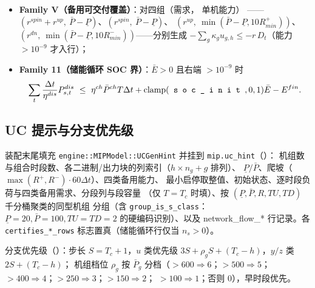 \begin{itemize}
\begin{equation}
        -\sum_g \bar P_g u_{g,h}-\sum_w P_{w,t}-\sum_s P_{s,t}
        -\sum_{s'}(P^{dis}_{s',t}-P^{ch}_{s',t})-\sum_d P^{dc}_{d,t}
        -P^{shed}_t+P^{curt}_t\le -(D_t+r^{up,tot}D_t),
        \label{eq:impl-famc}
        \end{equation}
        其中 $r^{up,tot}=r^{spin}+r^{up}$；下方向对偶地把系数反号、
        以 $\underline P_g$ 代 $\bar P_g$、右端取 $D_t-r^{dn}D_t$；
  \item \textbf{Family V（备用可交付覆盖）}：对四组（需求， 单机能力）
        ——$(r^{spin}+r^{up},\ \bar P-\underline P)$、$(r^{spin},\ \bar P-\underline P)$、
        $(r^{up},\ \min(\bar P-\underline P,10R^+_{min}))$、
        $(r^{dn},\ \min(\bar P-\underline P,10R^-_{min}))$——分别生成
        $-\sum_g \kappa_g u_{g,h}\le -r\,D_t$（能力 $>10^{-9}$ 才入行）；
  \item \textbf{Family 11（储能循环 SOC 界）}：$\bar E>0$ 且右端 $>10^{-9}$ 时
        \begin{equation}
        \sum_t \frac{\Delta t}{\eta^{dis}}P^{dis}_{s,t}\ \le\
        \eta^{ch}\bar P^{ch} T\Delta t+\mathrm{clamp}(\fld{soc\_init},0,1)\bar E-E^{fin}.
        \label{eq:impl-fam11}
        \end{equation}
\end{itemize}

\subsection{UC 提示与分支优先级}

装配末尾填充 \texttt{engine::MIPModel::UCGenHint} 并挂到
\texttt{mip.uc\_hint}（）：
机组数与组合时段数、各二进制/出力块的列索引（$h\times n_g+g$ 排列）、
$\underline P/\bar P$、爬坡（$\max(R^+,R^-)\cdot 60\Delta t$）、四类备用能力、
最小启停取整值、初始状态、逐时段负荷与四类备用需求、分段列与段容量
（仅 $T=T_c$ 时填）、按 $(\underline P,\bar P,R,TU,TD)$ 千分桶聚类的同型机组
分组（含 \texttt{group\_is\_s\_class}：$\underline P=20,\bar P=100,TU=TD=2$
的硬编码识别）、以及 network\_flow\_* 行记录。各
\texttt{certifies\_*\_rows} 标志置真（储能循环行仅当 $n_s>0$）。

分支优先级（）：步长
$S=T_c+1$，$u$ 类优先级 $3S+\rho_g S+(T_c-h)$，$y/z$ 类 $2S+(T_c-h)$；
机组档位 $\rho_g$ 按 $\bar P_g$ 分档（$>600\Rightarrow 6$；$>500\Rightarrow 5$；
$>400\Rightarrow 4$；$>250\Rightarrow 3$；$>150\Rightarrow 2$；
$>100\Rightarrow 1$；否则 0），早时段优先。

